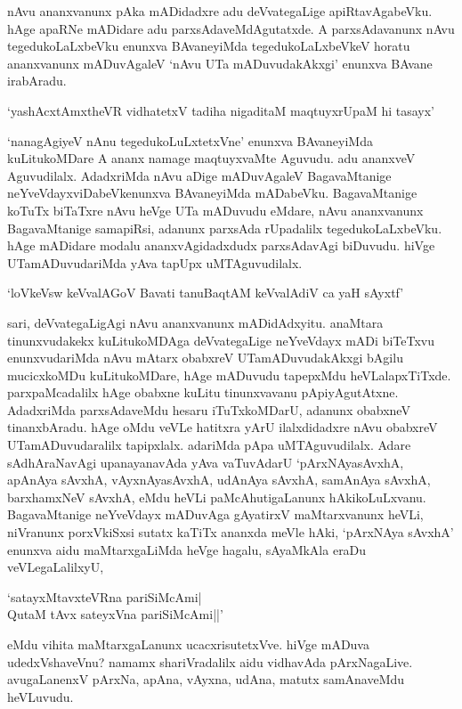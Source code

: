 nAvu ananxvanunx pAka mADidadxre adu deVvategaLige apiRtavAgabeVku. hAge apaRNe mADidare adu parxsAdaveMdAgutatxde. A parxsAdavanunx nAvu tegedukoLaLxbeVku enunxva BAvaneyiMda tegedukoLaLxbeVkeV horatu ananxvanunx mADuvAgaleV `nAvu UTa mADuvudakAkxgi' enunxva BAvane irabAradu.

\begin{shloka}
`yashAcxtAmxtheVR vidhatetxV tadiha nigaditaM maqtuyxrUpaM hi tasayx'
\end{shloka}

`nanagAgiyeV nAnu tegedukoLuLxtetxVne' enunxva BAvaneyiMda kuLitukoMDare A ananx namage maqtuyxvaMte Aguvudu. adu ananxveV Aguvudilalx. AdadxriMda nAvu aDige mADuvAgaleV BagavaMtanige neYveVdayxviDabeVkenunxva BAvaneyiMda mADabeVku. BagavaMtanige koTuTx biTaTxre nAvu heVge UTa mADuvudu eMdare, nAvu ananxvanunx BagavaMtanige samapiRsi, adanunx parxsAda rUpadalilx tegedukoLaLxbeVku. hAge mADidare modalu ananxvAgidadxdudx parxsAdavAgi biDuvudu. hiVge UTamADuvudariMda yAva tapUpx uMTAguvudilalx.

\begin{shloka}
`loVkeV\s sw keVvalAGoV Bavati tanuBaqtAM keVvalAdiV ca yaH sAyxtf'
\end{shloka}

sari, deVvategaLigAgi nAvu ananxvanunx mADidAdxyitu. anaMtara tinunxvudakekx kuLitukoMDAga deVvategaLige neYveVdayx mADi biTeTxvu enunxvudariMda nAvu mAtarx obabxreV UTamADuvudakAkxgi bAgilu mucicxkoMDu kuLitukoMDare, hAge mADuvudu tapepxMdu heVLalapxTiTxde. parxpaMcadalilx hAge obabxne kuLitu tinunxvavanu pApiyAgutAtxne. AdadxriMda parxsAdaveMdu hesaru iTuTxkoMDarU, adanunx obabxneV tinanxbAradu. hAge oMdu veVLe hatitxra yArU ilalxdidadxre nAvu obabxreV UTamADuvudaralilx tapipxlalx. adariMda pApa uMTAguvudilalx. Adare sAdhAraNavAgi upanayanavAda yAva vaTuvAdarU `pArxNAyasAvxhA, apAnAya sAvxhA, vAyxnAyasAvxhA, udAnAya sAvxhA, samAnAya sAvxhA, barxhamxNeV sAvxhA, eMdu heVLi paMcAhutigaLanunx hAkikoLuLxvanu. BagavaMtanige neYveVdayx mADuvAga gAyatirxV maMtarxvanunx heVLi, niVranunx porxVkiSxsi sutatx kaTiTx ananxda meVle hAki, `pArxNAya sAvxhA' enunxva aidu maMtarxgaLiMda heVge hagalu, sAyaMkAla eraDu veVLegaLalilxyU,

\begin{shloka}
`satayxMtavxteVRna pariSiMcAmi|\\
QutaM tAvx sateyxVna pariSiMcAmi||'
\end{shloka}

\noindent eMdu vihita maMtarxgaLanunx ucacxrisutetxVve. hiVge mADuva udedxVshaveVnu? namamx shariVradalilx aidu vidhavAda pArxNagaLive. avugaLanenxV pArxNa, apAna, vAyxna, udAna, matutx samAnaveMdu heVLuvudu.

